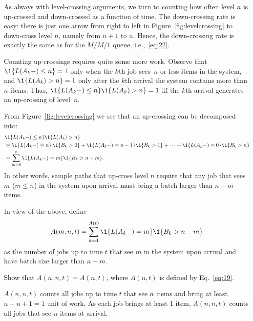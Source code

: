 As always with level-crossing arguments, we turn to counting how often level $n$ is up-crossed and down-crossed as a function of time.
The down-crossing rate is easy: there is just one arrow from right to left in Figure~\ref{fig:levelcrossing} to down-cross level $n$, namely from $n+1$ to $n$.
Hence, the down-crossing rate is exactly the same as for the $M/M/1$ queue, i.e.,~\eqref{eq:22}.

Counting up-crossings requires quite some more work.
Observe that $\1{L(A_k-)\leq n}=1$ only when the $k$th job sees~$n$ or less items in the system, and $\1{L(A_k) > n}=1$ only after the $k$th arrival the system contains more than $n$ items.
Thus, $\1{L(A_k-) \leq n}\1{ L(A_k)>n}=1$ iff the $k$th arrival generates an up-crossing of level~$n$.



From Figure~\ref{fig:levelcrossing} we see that an up-crossing can be decomposed into:
\begin{equation*}
  \begin{split}
&\1{L(A_k-) \leq n}\1{L(A_k)>n}  \\
&=  \1{L(A_k-) =n}\, \1{B_k >0} + \1{L(A_k-) =n-1}\1{ B_k >1} +\cdots + \1{L(A_k-) =0}\1{B_k > n} \\
&= \sum_{m=0}^n \1{L(A_k-) =m}\1{B_k > n-m}.
  \end{split}
\end{equation*}
In other words, sample paths that up-cross level $n$ require that any job that
sees $m$ ($m\leq n$) in the system upon arrival must bring a batch larger
than $n-m$ items.

In view of the above, define 
\begin{equation*}
  A(m,n,t) = \sum_{k=1}^{A(t)}\1{L(A_k-) = m}\1{B_k > n-m}
\end{equation*}
as the number of jobs up to time $t$ that see $m$ in the system upon
arrival and have batch size larger than $n-m$. 

\begin{exercise}{\faFlask}
   Show that $A(n, n,t) = A(n,t)$, where $A(n,t)$ is defined by Eq.~\eqref{eq:19}.
\begin{solution}
 $A(n,n,t)$ counts all jobs up to time $t$ that see $n$ items
    and bring at least $n-n+1=1$ unit of work. As each job brings at
    least 1 item, $A(n,n,t)$ counts all jobs that see $n$ items at
    arrival.
\end{solution}
\end{exercise}


